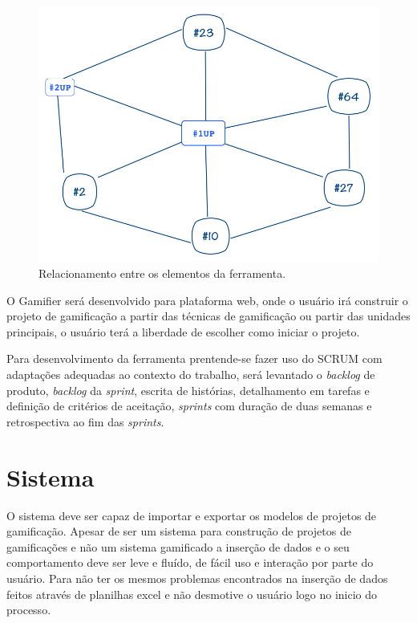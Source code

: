 \begin{figure}[h]
	\centering
		\includegraphics[keepaspectratio=true,scale=0.5]{figuras/grafo.png}
	\caption{Relacionamento entre os elementos da ferramenta.\label{fig05}}
\end{figure}



O Gamifier será desenvolvido para plataforma web, onde o usuário irá construir o projeto de gamificação a partir das técnicas de gamificação ou partir das unidades principais, o usuário terá a liberdade de escolher como iniciar o projeto. 

Para desenvolvimento da ferramenta prentende-se fazer uso do SCRUM com adaptações adequadas ao contexto do trabalho, será levantado o \textit{backlog} de produto, \textit{backlog} da \textit{sprint}, escrita de histórias, detalhamento em tarefas e definição de critérios de aceitação, \textit{sprints} com duração de duas semanas e retrospectiva ao fim das \textit{sprints}.

\section{Sistema}

O sistema deve ser capaz de importar e exportar os modelos de projetos de gamificação. Apesar de ser um sistema para construção de projetos de gamificações e não um sistema gamificado a inserção de dados e o seu comportamento deve ser leve e fluído, de fácil uso  e interação por parte do usuário. Para não ter os mesmos problemas encontrados na inserção de dados feitos através de planilhas excel e não desmotive o usuário logo no inicio do processo. 


